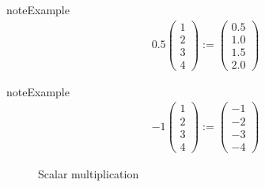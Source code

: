 \documentclass[letterpaper,10pt,english]{jupyterBook}
\begin{document}
\begin{sphinxadmonition}{note}{Example}
\begin{equation*}
\begin{split}
%
0.5 
\left(
\begin{array}{c}
1 \\
2 \\
3 \\
4
\end{array}
\right)
:=
\left(
\begin{array}{c}
0.5 \\
1.0 \\
1.5 \\
2.0 
\end{array}
\right)
%
\end{split}
\end{equation*}\end{sphinxadmonition}

\begin{sphinxadmonition}{note}{Example}
\begin{equation*}
\begin{split}
%
-1
\left(
\begin{array}{c}
1 \\
2 \\
3 \\
4
\end{array}
\right)
:=
\left(
\begin{array}{c}
-1 \\
-2 \\
-3 \\
-4
\end{array}
\right)
%
\end{split}
\end{equation*}\end{sphinxadmonition}

\begin{figure}[htbp]
\centering
\capstart

\noindent{}
\caption{Scalar multiplication}\label{\detokenize{05.linear_algebra:f-vec-scalar}}\end{figure}
\end{document}
